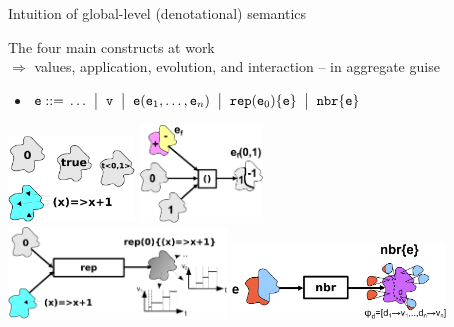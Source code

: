 \documentclass[presentation, 9pt]{beamer}\mode<presentation>{\usetheme{AMSBolognaFC}}
\begin{document}
\begin{frame}{Intuition of global-level (denotational) semantics}
	\begin{exampleblock}{The four main constructs at work\\ $\Rightarrow$ values, application, evolution, and interaction -- in aggregate guise}
	\begin{itemize}
		\item $\texttt{e} \;{\bf ::=}\; \ldots
   \; \;\bigr\rvert\; \; {\texttt{v}}
   \; \;\bigr\rvert\; \; {\texttt{e}} (\texttt{e}_1,\ldots,\texttt{e}_n)
   \;\;\bigr\rvert\; \; \texttt{rep}(\texttt{e}_0)\{\texttt{e}\}
   \; \;\bigr\rvert\; \; \texttt{nbr}\{\texttt{e}\}$
	\end{itemize}
	\end{exampleblock}
\begin{center}
\includegraphics[height=2.3cm]{img/ing-v.pdf}\hspace{30pt}
\includegraphics[height=2.57cm]{img/ing-mix5.pdf}\\[5pt]
\includegraphics[height=2.42cm]{img/ing-rep2.pdf}\hspace{10pt}
\includegraphics[height=1.96cm]{img/ing-nbr4.pdf}\end{center}
\end{frame}
\end{document}
